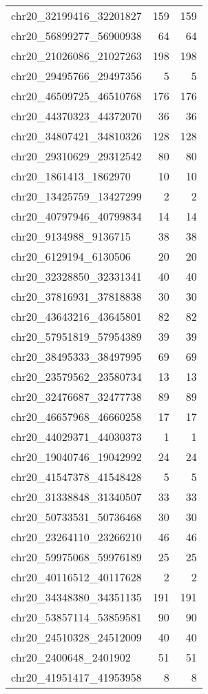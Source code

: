 \begin{longtable}{lrr}
chr20_32199416_32201827 & 159 & 159 \\
chr20_56899277_56900938 & 64 & 64 \\
chr20_21026086_21027263 & 198 & 198 \\
chr20_29495766_29497356 & 5 & 5 \\
chr20_46509725_46510768 & 176 & 176 \\
chr20_44370323_44372070 & 36 & 36 \\
chr20_34807421_34810326 & 128 & 128 \\
chr20_29310629_29312542 & 80 & 80 \\
chr20_1861413_1862970 & 10 & 10 \\
chr20_13425759_13427299 & 2 & 2 \\
chr20_40797946_40799834 & 14 & 14 \\
chr20_9134988_9136715 & 38 & 38 \\
chr20_6129194_6130506 & 20 & 20 \\
chr20_32328850_32331341 & 40 & 40 \\
chr20_37816931_37818838 & 30 & 30 \\
chr20_43643216_43645801 & 82 & 82 \\
chr20_57951819_57954389 & 39 & 39 \\
chr20_38495333_38497995 & 69 & 69 \\
chr20_23579562_23580734 & 13 & 13 \\
chr20_32476687_32477738 & 89 & 89 \\
chr20_46657968_46660258 & 17 & 17 \\
chr20_44029371_44030373 & 1 & 1 \\
chr20_19040746_19042992 & 24 & 24 \\
chr20_41547378_41548428 & 5 & 5 \\
chr20_31338848_31340507 & 33 & 33 \\
chr20_50733531_50736468 & 30 & 30 \\
chr20_23264110_23266210 & 46 & 46 \\
chr20_59975068_59976189 & 25 & 25 \\
chr20_40116512_40117628 & 2 & 2 \\
chr20_34348380_34351135 & 191 & 191 \\
chr20_53857114_53859581 & 90 & 90 \\
chr20_24510328_24512009 & 40 & 40 \\
chr20_2400648_2401902 & 51 & 51 \\
chr20_41951417_41953958 & 8 & 8 \\

\end{longtable}
